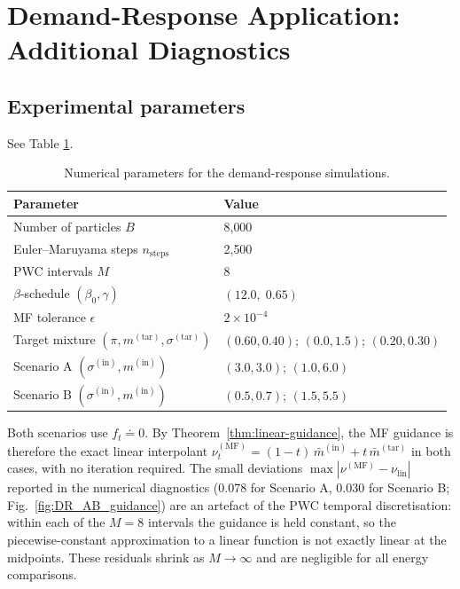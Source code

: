 \documentclass[11pt,onecolumn]{article}
\newcommand{\MF}{\mathrm{MF}}
\begin{document}
\section{Demand-Response Application: Additional Diagnostics}
\label{SI:dr}

\subsection{Experimental parameters}
\label{SI:dr:params}

See Table \ref{table:num-parameters}.

\begin{table}[h!]
\centering
\caption{Numerical parameters for the demand-response simulations.
\label{table:num-parameters}}
\small
\begin{tabular}{ll}
\toprule
Parameter & Value \\
\midrule
Number of particles $B$ & 8{,}000 \\
Euler--Maruyama steps $n_\mathrm{steps}$ & 2{,}500 \\
PWC intervals $M$ & 8 \\
$\beta$-schedule $(\beta_0,\gamma)$ & $(12.0,\;0.65)$ \\
MF tolerance $\epsilon$ & $2\times10^{-4}$ \\
\midrule
Target mixture $(\pi,m^{(\mathrm{tar})},\sigma^{(\mathrm{tar})})$
  & $(0.60,0.40)$; $(0.0,1.5)$; $(0.20,0.30)$ \\
Scenario A $(\sigma^{(\mathrm{in})},m^{(\mathrm{in})})$
  & $(3.0,3.0)$; $(1.0,6.0)$ \\
Scenario B $(\sigma^{(\mathrm{in})},m^{(\mathrm{in})})$
  & $(0.5,0.7)$; $(1.5,5.5)$ \\
\bottomrule
\end{tabular}
\end{table}

Both scenarios use $f_t\doteq  0$.
By Theorem~\ref{thm:linear-guidance}, the MF guidance is therefore
the exact linear interpolant
$\nu_t^{(\MF)} = (1-t)\,\bar m^{(\mathrm{in})} + t\,\bar m^{(\mathrm{tar})}$
in both cases, with no iteration required.
The small deviations $\max|\nu^{(\MF)}-\nu_{\mathrm{lin}}|$
reported in the numerical diagnostics (0.078 for Scenario A,
0.030 for Scenario B; Fig.~\ref{fig:DR_AB_guidance}) are an artefact
of the PWC temporal discretisation: within each of the $M=8$ intervals
the guidance is held constant, so the piecewise-constant approximation
to a linear function is not exactly linear at the midpoints.
These residuals shrink as $M\to\infty$ and are negligible for all
energy comparisons.
\end{document}
